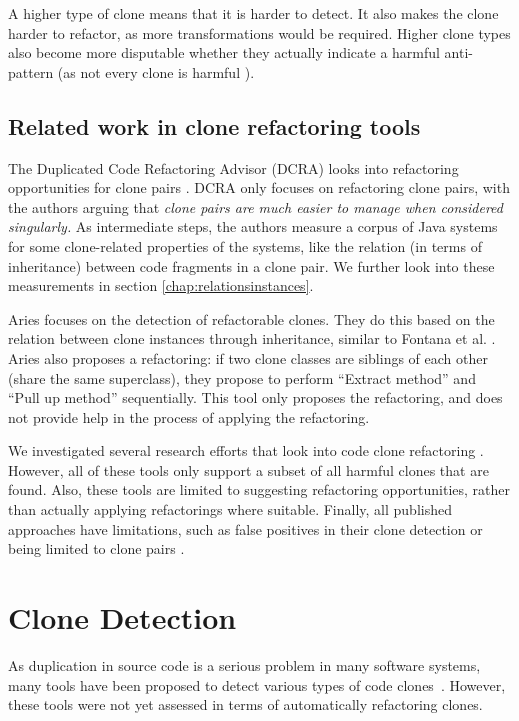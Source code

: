 \documentclass[a4paper]{article}
\begin{document}
A higher type of clone means that it is harder to detect. It also makes the clone harder to refactor, as more transformations would be required. Higher clone types also become more disputable whether they actually indicate a harmful anti-pattern (as not every clone is harmful \cite{jarzabek2010clones, kapser2008cloning}).

\subsection{Related work in clone refactoring tools}
The Duplicated Code Refactoring Advisor (DCRA) looks into refactoring opportunities for clone pairs \cite{fontana2012duplicated, fontana2015duplicated}. DCRA only focuses on refactoring clone pairs, with the authors arguing that \textit{clone pairs are much easier to manage when considered singularly.} As intermediate steps, the authors measure a corpus of Java systems for some clone-related properties of the systems, like the relation (in terms of inheritance) between code fragments in a clone pair. We further look into these measurements in section \ref{chap:relationsinstances}.

Aries \cite{higo2004aries, higo2008metric} focuses on the detection of refactorable clones. They do this based on the relation between clone instances through inheritance, similar to Fontana et al. \cite{fontana2012duplicated}. Aries also proposes a refactoring: if two clone classes are siblings of each other (share the same superclass), they propose to perform ``Extract method'' and ``Pull up method'' sequentially. This tool only proposes the refactoring, and does not provide help in the process of applying the refactoring.

We investigated several research efforts that look into code clone refactoring \cite{alwaqfi2017refactoring, chen2018clone, koni2001scenario}. However, all of these tools only support a subset of all harmful clones that are found. Also, these tools are limited to suggesting refactoring opportunities, rather than actually applying refactorings where suitable. Finally, all published approaches have limitations, such as false positives in their clone detection \cite{chen2018clone} or being limited to clone pairs \cite{higo2008metric}.

\section{Clone Detection}\label{chap:clonedetection}
As duplication in source code is a serious problem in many software systems, many tools have been proposed to detect various types of code clones~\cite{sheneamer2016survey, svajlenko2014evaluating}. However, these tools were not yet assessed in terms of automatically refactoring clones.
\end{document}
